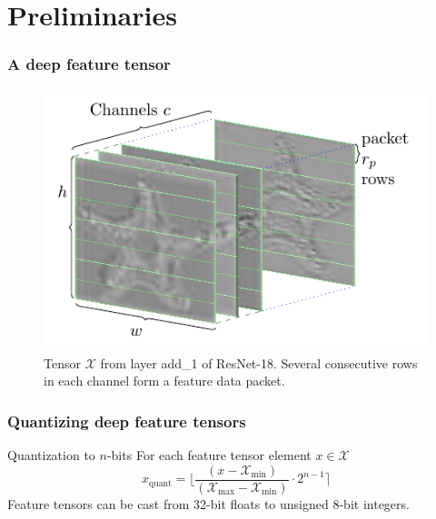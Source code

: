 \documentclass[aspectratio=169]{beamer}
\begin{document}
\section{Preliminaries}
\begin{frame}
	\frametitle{A deep feature tensor}
	\begin{figure}[H]
		\centering\includegraphics[scale=0.9]{tensorlostviz3icip.pdf}
		\caption{Tensor $\mathcal{X}$ from layer add\_1 of ResNet-18. Several consecutive rows in each channel form a feature data packet.}
	\end{figure}
\end{frame}

\begin{frame}
	\frametitle{Quantizing deep feature tensors}
	\begin{block}{Quantization to $n$-bits}
		For each feature tensor element $x \in \mathcal{X}$
		\[
		x_{\text{quant}} = \Bigg \lfloor \frac{(x - \mathcal{X}_{\text{min}})}{( \mathcal{X}_{\text{max}} -  \mathcal{X}_{\text{min}})} \cdot 2^{n-1} \Bigg \rceil
		\]
		Feature tensors can be cast from 32-bit floats to unsigned 8-bit integers.
	\end{block}
\end{frame}
\end{document}

